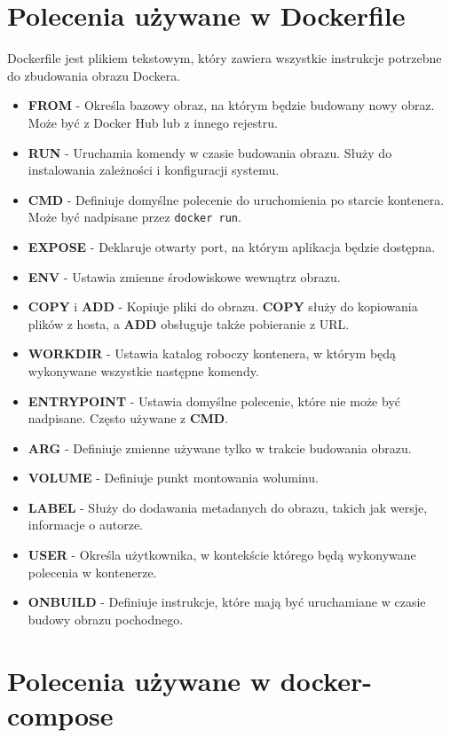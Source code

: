 \documentclass[a4paper,12pt]{article}
\begin{document}
\section{Polecenia używane w Dockerfile}

Dockerfile jest plikiem tekstowym, który zawiera wszystkie instrukcje potrzebne do zbudowania obrazu Dockera.

\begin{itemize}
    \item \textbf{FROM} - Określa bazowy obraz, na którym będzie budowany nowy obraz. Może być z Docker Hub lub z innego rejestru.
    \item \textbf{RUN} - Uruchamia komendy w czasie budowania obrazu. Służy do instalowania zależności i konfiguracji systemu.
    \item \textbf{CMD} - Definiuje domyślne polecenie do uruchomienia po starcie kontenera. Może być nadpisane przez \texttt{docker run}.
    \item \textbf{EXPOSE} - Deklaruje otwarty port, na którym aplikacja będzie dostępna.
    \item \textbf{ENV} - Ustawia zmienne środowiskowe wewnątrz obrazu.
    \item \textbf{COPY} i \textbf{ADD} - Kopiuje pliki do obrazu. \textbf{COPY} służy do kopiowania plików z hosta, a \textbf{ADD} obsługuje także pobieranie z URL.
    \item \textbf{WORKDIR} - Ustawia katalog roboczy kontenera, w którym będą wykonywane wszystkie następne komendy.
    \item \textbf{ENTRYPOINT} - Ustawia domyślne polecenie, które nie może być nadpisane. Często używane z \textbf{CMD}.
    \item \textbf{ARG} - Definiuje zmienne używane tylko w trakcie budowania obrazu.
    \item \textbf{VOLUME} - Definiuje punkt montowania woluminu.
    \item \textbf{LABEL} - Służy do dodawania metadanych do obrazu, takich jak wersje, informacje o autorze.
    \item \textbf{USER} - Określa użytkownika, w kontekście którego będą wykonywane polecenia w kontenerze.
    \item \textbf{ONBUILD} - Definiuje instrukcje, które mają być uruchamiane w czasie budowy obrazu pochodnego.
\end{itemize}

\section{Polecenia używane w docker-compose}
\end{document}
